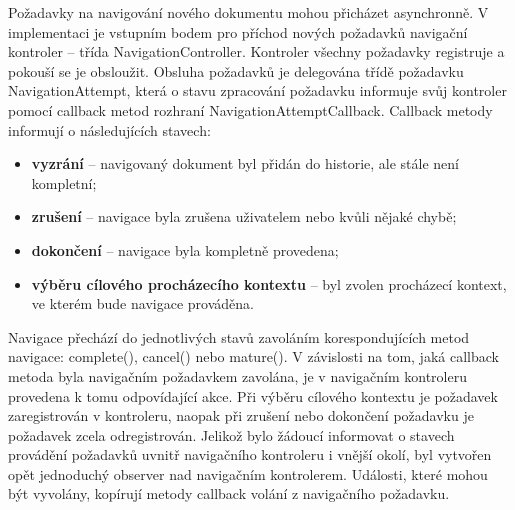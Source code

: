 Požadavky na navigování nového dokumentu mohou přicházet asynchronně. V implementaci je vstupním bodem pro příchod nových požadavků navigační kontroler – třída NavigationController. Kontroler všechny požadavky registruje a pokouší se je obsloužit. Obsluha požadavků je delegována třídě požadavku NavigationAttempt, která o stavu zpracování požadavku informuje svůj kontroler pomocí callback metod rozhraní NavigationAttemptCallback. Callback metody informují o následujících stavech:

\begin{itemize}
  \item \textbf{vyzrání} -- navigovaný dokument byl přidán do historie, ale stále není kompletní;
  \item \textbf{zrušení} -- navigace byla zrušena uživatelem nebo kvůli nějaké chybě;
  \item \textbf{dokončení} -- navigace byla kompletně provedena; 
  \item \textbf{výběru cílového procházecího kontextu} -- byl zvolen procházecí kontext, ve kterém bude navigace prováděna.
\end{itemize}

Navigace přechází do jednotlivých stavů zavoláním korespondujících metod navigace: complete(), cancel() nebo mature(). V závislosti na tom, jaká callback metoda byla navigačním požadavkem zavolána, je v navigačním kontroleru provedena k tomu odpovídající akce. Při výběru cílového kontextu je požadavek zaregistrován v kontroleru, naopak při zrušení nebo dokončení požadavku je požadavek zcela odregistrován. Jelikož bylo žádoucí informovat o stavech provádění požadavků uvnitř navigačního kontroleru i vnější okolí, byl vytvořen opět jednoduchý observer nad navigačním kontrolerem. Události, které mohou být vyvolány, kopírují metody callback volání z navigačního požadavku. 

